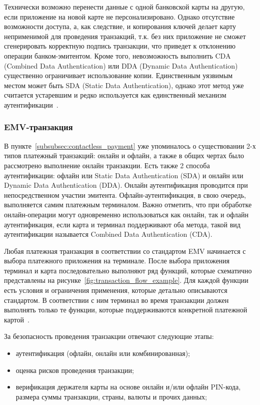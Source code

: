 Технически возможно перенести данные с одной банковской карты на другую, если приложение на новой карте не персонализировано.
Однако отсутствие возможности доступа, а, как следствие, и копирования ключей делает карту неприменимой для проведения транзакций, т.к. без них приложение не сможет сгенерировать корректную подпись транзакции, что приведет к отклонению операции банком-эмитентом.
Кроме того, невозможность выполнить CDA (Combined Data Authentication) или DDA (Dynamic Data Authentication) существенно ограничивает использование копии.
Единственным уязвимым местом может быть SDA (Static Data Authentication), однако этот метод уже считается устаревшим и редко используется как единственный механизм аутентификации~\cite{emv_card_mechanism}.

\subsubsection{EMV-транзакция}
\label{subsubsec:emv_transaction}

В пункте~\ref{subsubsec:contactless_payment} уже упоминалось о существовании 2-х типов платежный транзакций: онлайн и офлайн, а также в общих чертах было рассмотрено выполнение онлайн транзакции.
Есть также 2 способа аутентификации: офлайн или Static Data Authentication (SDA) и онлайн или Dynamic Data Authentication (DDA).
Онлайн аутентификация проводится при непосредственном участии эмитента.
Офлайн-аутентификация, в свою очередь, выполняется самим платежным терминалом.
Важно отметить, что при обработке онлайн-операции могут одновременно использоваться как онлайн, так и офлайн аутентификация, если карта и терминал поддерживают оба метода, такой вид аутентификации называется Combined Data Authentication (CDA).

Любая платежная транзакция в соответствии со стандартом EMV начинается с выбора платежного приложения на терминале.
После выбора приложения терминал и карта последовательно выполняют ряд функций, которые схематично представлены на рисунке~\ref{fig:transaction_flow_example}.
Для каждой функции есть условия и ограничения применения, которые детально описываются стандартом.
В соответствии с ним терминал во время транзакции должен выполнять только те функции, которые поддерживаются конкретной платежной картой~\cite{emv_book_3}.

За безопасность проведения транзакции отвечают следующие этапы:

\begin{itemize}
    \item аутентификация (офлайн, онлайн или комбинированная);
    \item оценка рисков проведения транзакции;
    \item верификация держателя карты на основе онлайн и/или офлайн PIN-кода, размера суммы транзакции, страны, валюты и прочих данных;
\end{itemize}

